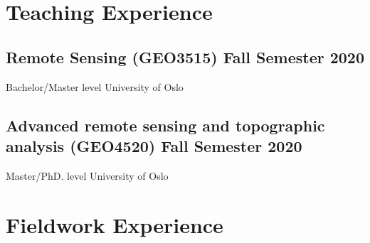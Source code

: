 \documentclass[a4,10pt]{article}
\newcommand{\subtext}[1]{
#1\par\vspace{-0.2cm}}
\begin{document}
\section{Teaching Experience}

\subsection*{Remote Sensing (GEO3515) \hfill Fall Semester 2020} 
\subtext{Bachelor/Master level \hfill University of Oslo} 

\subsection*{Advanced remote sensing and topographic analysis (GEO4520) \hfill Fall Semester 2020} 
\subtext{Master/PhD. level \hfill University of Oslo} 



\section{Fieldwork Experience} %
\end{document}
